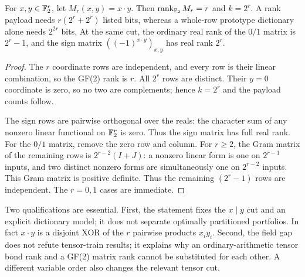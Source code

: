 \begin{proposition}
\label{prop:gap}
For $x,y\in\mathbb F_2^r$, let $M_r(x,y)=x\cdot y$. Then $\operatorname{rank}_{\mathbb F_2}M_r=r$ and $k=2^r$. A rank payload needs $r(2^r+2^r)$ listed bits, whereas a whole-row prototype dictionary alone needs $2^{2r}$ bits. At the same cut, the ordinary real rank of the $0/1$ matrix is $2^r-1$, and the sign matrix $((-1)^{x\cdot y})_{x,y}$ has real rank $2^r$.
\end{proposition}
\begin{proof}
The $r$ coordinate rows are independent, and every row is their linear combination, so the GF(2) rank is $r$. All $2^r$ rows are distinct. Their $y=0$ coordinate is zero, so no two are complements; hence $k=2^r$ and the payload counts follow.

The sign rows are pairwise orthogonal over the reals: the character sum of any nonzero linear functional on $\mathbb F_2^r$ is zero. Thus the sign matrix has full real rank. For the $0/1$ matrix, remove the zero row and column. For $r\ge2$, the Gram matrix of the remaining rows is $2^{r-2}(I+J)$: a nonzero linear form is one on $2^{r-1}$ inputs, and two distinct nonzero forms are simultaneously one on $2^{r-2}$ inputs. This Gram matrix is positive definite. Thus the remaining $(2^r-1)$ rows are independent. The $r=0,1$ cases are immediate.
\end{proof}

Two qualifications are essential. First, the statement fixes the $x\mid y$ cut and an explicit dictionary model; it does not separate optimally partitioned portfolios. In fact $x\cdot y$ is a disjoint XOR of the $r$ pairwise products $x_i y_i$. Second, the field gap does not refute tensor-train results\cite{onaka2025}; it explains why an ordinary-arithmetic tensor bond rank and a GF(2) matrix rank cannot be substituted for each other. A different variable order also changes the relevant tensor cut.
